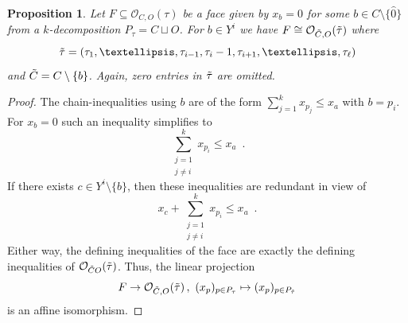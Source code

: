 \documentclass[12pt,a4paper]{amsart}
\newtheorem{proposition}[theorem]{Proposition}
\theoremstyle{definition}
\newcommand{\OP}{\mathcal{O}}
\begin{document}
\begin{proposition}\label{Proposition-Zero-Variable-Face}
   Let $F\subseteq\OP_{C,O}(\tau)$ be a face given by $x_b=0$ for some $b\in C\setminus\{\hat{0}\}$ from a $k$-decomposition $P_\tau=C \sqcup O$.
   For $b\in Y^i$ we have $F\cong\OP_{\Tilde{C},O}(\Tilde{\tau})$
   where
   \begin{equation*}
     \Tilde{\tau}=(\tau_1,\dots,\tau_{i-1},\tau_{i}-1,\tau_{i+1},\dots,\tau_{\ell})
   \end{equation*}
   and $\Tilde{C}=C\setminus\{b\}$.
   Again, zero entries in $\Tilde{\tau}$ are omitted.
\end{proposition}
\begin{proof}
  The chain-inequalities using $b$ are of the form $\sum_{j=1}^{k}x_{p_{j}}\leq x_{a}$  with $b=p_{i}$.
  For $x_b=0$ such an inequality simplifies to
  \begin{equation*}
    \sum\limits_{\substack{j=1\\j\neq i}}^{k}x_{p_{i}}\leq x_{a} \enspace .
  \end{equation*}
  If there exists $c\in Y^{{i}}\setminus\{b\}$, then these inequalities are redundant in view of
  \begin{equation*}
    x_{c}+\sum\limits_{\substack{j=1\\j\neq i}}^{k}x_{p_{i}}\leq x_{a} \enspace .
  \end{equation*}
  Either way, the defining inequalities of the face are exactly the defining inequalities of $\OP_{\Tilde{C}O}(\Tilde{\tau})$.
  Thus, the linear projection
  \[
    F\rightarrow\OP_{\Tilde{C},O}(\Tilde{\tau}) \,,\ (x_{p})_{p\in P_\tau}\mapsto (x_{p})_{p\in P_{\Tilde{\tau}}}
  \]
  is an affine isomorphism.
\end{proof}
\end{document}

